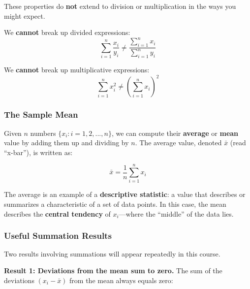 \documentclass[
  letterpaper,
  DIV=11,
  numbers=noendperiod]{scrreprt}
\begin{document}
\begin{tcolorbox}[enhanced jigsaw, arc=.35mm, bottomrule=.15mm, bottomtitle=1mm, breakable, colback=white, colbacktitle=quarto-callout-warning-color!10!white, colframe=quarto-callout-warning-color-frame, coltitle=black, left=2mm, leftrule=.75mm, opacityback=0, opacitybacktitle=0.6, rightrule=.15mm, title=\textcolor{quarto-callout-warning-color}{\faExclamationTriangle}\hspace{0.5em}{Common Mistakes with Summation}, titlerule=0mm, toprule=.15mm, toptitle=1mm]

These properties do \textbf{not} extend to division or multiplication in
the ways you might expect.

We \textbf{cannot} break up divided expressions: \[
\sum_{i=1}^{n} \frac{x_i}{y_i} \neq \frac{\sum_{i=1}^{n} x_i}{\sum_{i=1}^{n} y_i}
\]

We \textbf{cannot} break up multiplicative expressions: \[
\sum_{i=1}^{n} x_i^2 \neq \left(\sum_{i=1}^{n} x_i\right)^2
\]

\end{tcolorbox}

\subsubsection{The Sample Mean}\label{the-sample-mean}

Given \(n\) numbers \(\{x_i: i = 1, 2, ..., n\}\), we can compute their
\textbf{average} or \textbf{mean} value by adding them up and dividing
by \(n\). The average value, denoted \(\bar{x}\) (read ``x-bar''), is
written as:

\[
\bar{x} = \frac{1}{n} \sum_{i=1}^{n} x_i
\]

The average is an example of a \textbf{descriptive statistic}: a value
that describes or summarizes a characteristic of a set of data points.
In this case, the mean describes the \textbf{central tendency} of
\(x_i\)---where the ``middle'' of the data lies.

\subsubsection{Useful Summation Results}\label{useful-summation-results}

Two results involving summations will appear repeatedly in this course.

\textbf{Result 1: Deviations from the mean sum to zero.} The sum of the
deviations \((x_i - \bar{x})\) from the mean always equals zero:
\end{document}
